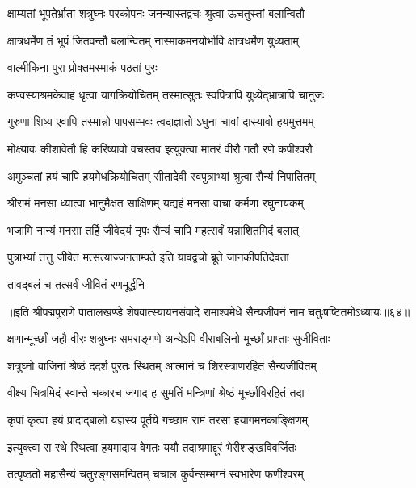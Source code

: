 \twolineshloka
{क्षाम्यतां भूपतेर्भ्राता शत्रुघ्नः परकोपनः}
{जनन्यास्तद्वचः श्रुत्वा ऊचतुस्तां बलान्वितौ}%

\twolineshloka
{क्षात्रधर्मेण तं भूपं जितवन्तौ बलान्वितम्}
{नास्माकमनयोर्भावि क्षात्रधर्मेण युध्यताम्}%

\onelineshloka
{वाल्मीकिना पुरा प्रोक्तमस्माकं पठतां पुरः}%

\twolineshloka
{कण्वस्याश्रमकेवाहं धृत्वा यागक्रियोचितम्}
{तस्मात्सुतः स्वपित्रापि युध्येद्भ्रात्रापि चानुजः}%

\twolineshloka
{गुरुणा शिष्य एवापि तस्मान्नो पापसम्भवः}
{त्वदाज्ञातो ऽधुना चावां दास्यावो हयमुत्तमम्}%

\twolineshloka
{मोक्ष्यावः कीशावेतौ हि करिष्यावो वचस्तव}
{इत्युक्त्वा मातरं वीरौ गतौ रणे कपीश्वरौ}%

\twolineshloka
{अमुञ्चतां हयं चापि हयमेधक्रियोचितम्}
{सीतादेवी स्वपुत्राभ्यां श्रुत्वा सैन्यं निपातितम्}%

\twolineshloka
{श्रीरामं मनसा ध्यात्वा भानुमैक्षत साक्षिणम्}
{यद्यहं मनसा वाचा कर्मणा रघुनायकम्}%

\twolineshloka
{भजामि नान्यं मनसा तर्हि जीवेदयं नृपः}
{सैन्यं चापि महत्सर्वं यन्नाशितमिदं बलात्}%

\twolineshloka
{पुत्राभ्यां तत्तु जीवेत मत्सत्याज्जगताम्पते}
{इति यावद्वचो ब्रूते जानकीपतिदेवता}%

\onelineshloka
{तावद्बलं च तत्सर्वं जीवितं रणमूर्द्धनि}%

{॥इति श्रीपद्मपुराणे पातालखण्डे शेषवात्स्यायनसंवादे रामाश्वमेधे सैन्यजीवनं नाम चतुःषष्टितमोऽध्यायः॥६४॥}

\resetShloka


\twolineshloka
{क्षणान्मूर्च्छां जहौ वीरः शत्रुघ्नः समराङ्गणे}
{अन्येऽपि वीराबलिनो मूर्च्छां प्राप्ताः सुजीविताः}%

\twolineshloka
{शत्रुघ्नो वाजिनां श्रेष्ठं ददर्श पुरतः स्थितम्}
{आत्मानं च शिरस्त्राणरहितं सैन्यजीवितम्}%

\twolineshloka
{वीक्ष्य चित्रमिदं स्वान्ते चकारच जगाद ह}
{सुमतिं मन्त्रिणां श्रेष्ठं मूर्च्छाविरहितं तदा}%

\twolineshloka
{कृपां कृत्वा हयं प्रादाद्बालो यज्ञस्य पूर्तये}
{गच्छाम रामं तरसा हयागमनकाङ्क्षिणम्}%

\twolineshloka
{इत्युक्त्वा स रथे स्थित्वा हयमादाय वेगतः}
{ययौ तदाश्रमाद्दूरं भेरीशङ्खविवर्जितः}%

\twolineshloka
{तत्पृष्ठतो महासैन्यं चतुरङ्गसमन्वितम्}
{चचाल कुर्वन्सम्भग्नं स्वभारेण फणीश्वरम्}%

